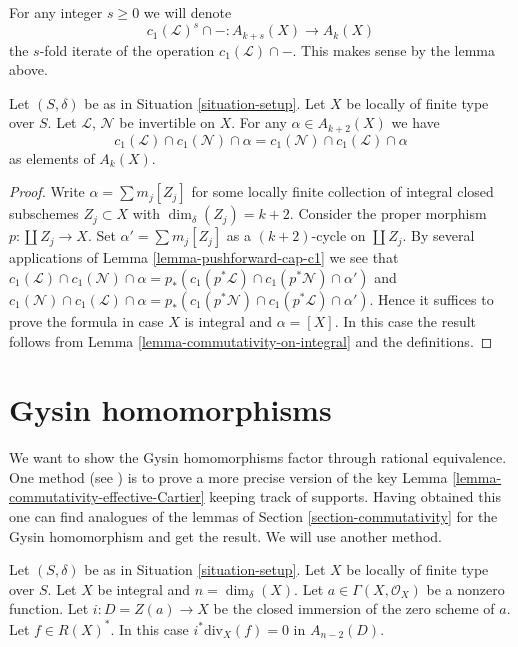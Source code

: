 \noindent
For any integer $s \geq 0$ we will denote
$$
c_1(\mathcal{L})^s \cap - : A_{k + s}(X) \to A_k(X)
$$
the $s$-fold iterate of the operation $c_1(\mathcal{L}) \cap - $.
This makes sense by the lemma above.

\begin{lemma}
\label{lemma-cap-commutative}
Let $(S, \delta)$ be as in Situation \ref{situation-setup}.
Let $X$ be locally of finite type over $S$.
Let $\mathcal{L}$, $\mathcal{N}$ be invertible on $X$.
For any $\alpha \in A_{k + 2}(X)$ we have
$$
c_1(\mathcal{L}) \cap c_1(\mathcal{N}) \cap \alpha
=
c_1(\mathcal{N}) \cap c_1(\mathcal{L}) \cap \alpha
$$
as elements of $A_k(X)$.
\end{lemma}

\begin{proof}
Write $\alpha = \sum m_j[Z_j]$ for some locally finite
collection of integral closed subschemes $Z_j \subset X$
with $\dim_\delta(Z_j) = k + 2$.
Consider the proper morphism $p : \coprod Z_j \to X$.
Set $\alpha' = \sum m_j[Z_j]$ as a $(k + 2)$-cycle on
$\coprod Z_j$. By several applications of
Lemma \ref{lemma-pushforward-cap-c1} we see that
$c_1(\mathcal{L}) \cap c_1(\mathcal{N}) \cap \alpha
= p_*(c_1(p^*\mathcal{L}) \cap c_1(p^*\mathcal{N}) \cap \alpha')$
and
$c_1(\mathcal{N}) \cap c_1(\mathcal{L}) \cap \alpha
= p_*(c_1(p^*\mathcal{N}) \cap c_1(p^*\mathcal{L}) \cap \alpha')$.
Hence it suffices to prove the formula in case $X$ is integral
and $\alpha = [X]$. In this case the result follows
from Lemma \ref{lemma-commutativity-on-integral} and the definitions.
\end{proof}








\section{Gysin homomorphisms}
\label{section-gysin}

\noindent
We want to show the Gysin homomorphisms factor through rational equivalence.
One method (see \cite{F}) is to prove a more precise version of the
key Lemma \ref{lemma-commutativity-effective-Cartier} keeping track of
supports. Having obtained this one can find analogues of the lemmas of Section
\ref{section-commutativity} for the Gysin homomorphism and get the result.
We will use another method.

\begin{lemma}
\label{lemma-gysin-factors-principal}
Let $(S, \delta)$ be as in Situation \ref{situation-setup}.
Let $X$ be locally of finite type over $S$.
Let $X$ be integral and $n = \dim_\delta(X)$.
Let $a \in \Gamma(X, \mathcal{O}_X)$ be a nonzero function.
Let $i : D = Z(a) \to X$ be the closed immersion of the zero scheme of $a$.
Let $f \in R(X)^*$.
In this case $i^*\text{div}_X(f) = 0$ in $A_{n - 2}(D)$.
\end{lemma}


